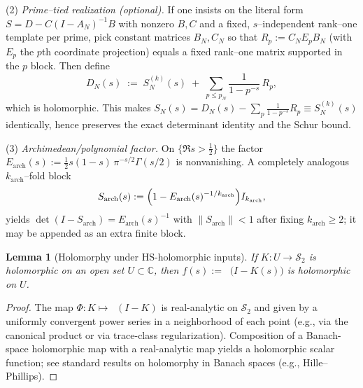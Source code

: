 \documentclass[11pt]{article}
\newtheorem{lemma}[theorem]{Lemma}
\theoremstyle{definition}
\theoremstyle{remark}
\newcommand{\C}{\mathbb{C}}
\newcommand{\HS}{\mathcal{S}_2}
\DeclareMathOperator{\dettwo}{det_2}
\begin{document}
(2) \emph{Prime--tied realization (optional).} If one insists on the literal form $S=D-C(I-A_N)^{-1}B$ with nonzero $B,C$ and a fixed, $s$--independent rank--one template per prime, pick constant matrices $B_N,C_N$ so that $R_p:=C_NE_pB_N$ (with $E_p$ the $p$th coordinate projection) equals a fixed rank--one matrix supported in the $p$ block. Then define
\[
 D_N(s)\;:=\;S_{N}^{(k)}(s)\;+\;\sum_{p\le p_N}\frac{1}{1-p^{-s}}\,R_p,
\]
which is holomorphic. This makes $S_N(s)=D_N(s)-\sum_p \frac{1}{1-p^{-s}}R_p\equiv S_{N}^{(k)}(s)$ identically, hence preserves the exact determinant identity and the Schur bound.

(3) \emph{Archimedean/polynomial factor.} On $\{\Re s>\tfrac12\}$ the factor $E_{\mathrm{arch}}(s):=\tfrac12 s(1-s)\,\pi^{-s/2}\Gamma(s/2)$ is nonvanishing. A completely analogous $k_{\mathrm{arch}}$--fold block
\[
 S_{\mathrm{arch}}(s):=\Bigl(1-E_{\mathrm{arch}}(s)^{-1/k_{\mathrm{arch}}}\Bigr)I_{k_{\mathrm{arch}}},
\]
yields $\det(I-S_{\mathrm{arch}})=E_{\mathrm{arch}}(s)^{-1}$ with $\|S_{\mathrm{arch}}\|<1$ after fixing $k_{\mathrm{arch}}\ge 2$; it may be appended as an extra finite block.
\begin{lemma}[Holomorphy under HS-holomorphic inputs]\label{lem:holomorphy}
If \(K:U\to\HS\) is holomorphic on an open set \(U\subset\C\), then \(f(s):=\dettwo\big(I-K(s)\big)\) is holomorphic on \(U\).
\end{lemma}
\begin{proof}
The map \(\Phi:K\mapsto \dettwo(I-K)\) is real-analytic on \(\HS\) and given by a uniformly convergent power series in a neighborhood of each point (e.g., via the canonical product or via trace-class regularization). Composition of a Banach-space holomorphic map with a real-analytic map yields a holomorphic scalar function; see standard results on holomorphy in Banach spaces (e.g., Hille--Phillips).
\end{proof}
\end{document}
